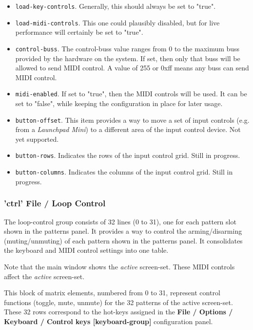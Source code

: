    \begin{itemize}
      \item \texttt{load-key-controls}.
         Generally, this should always be set to "true".
      \item \texttt{load-midi-controls}.
         This one could plausibly disabled, but for live performance will
         certainly be set to "true".
      \item \texttt{control-buss}.
         The control-buss value ranges from 0 to the maximum buss provided by
         the hardware on the system. If set, then only that buss will be allowed
         to send MIDI control.  A value of 255 or 0xff means any buss can send
         MIDI control.
      \item \texttt{midi-enabled}.
         If set to "true", then the MIDI controls will be used.
         It can be set to "false", while keeping the configuration in place
         for later usage.
      \item \texttt{button-offset}.
         This item provides a way to move a set of input controls (e.g. from a
         \textsl{Launchpad Mini}) to a different area of the input control
         device.  Not yet supported.
      \item \texttt{button-rows}.
         Indicates the rows of the input control grid.
         Still in progress.
      \item \texttt{button-columns}.
         Indicates the columns of the input control grid.
         Still in progress.
   \end{itemize}

\subsubsection{'ctrl' File / Loop Control}
\label{subsubsec:configuration_ctrl_loop_control}

   The loop-control group consists of 32 lines (0 to 31), one for each
   pattern slot shown in the patterns panel.
   It provides a way to control the arming/disarming (muting/unmuting) of
   each pattern shown in the patterns panel.
   It consolidates the keyboard and MIDI control settings into one table.

   Note that the main window shows the \textsl{active} screen-set.
   These MIDI controls affect the \textsl{active} screen-set.

   This block of matrix elements, numbered from 0 to 31,
   represent control functions (toggle, mute, unmute) for the 32 patterns
   of the active screen-set.
   These 32 rows correspond to the hot-keys assigned in
   the \textbf{File / Options / Keyboard / Control keys [keyboard-group]} 
   configuration panel.

